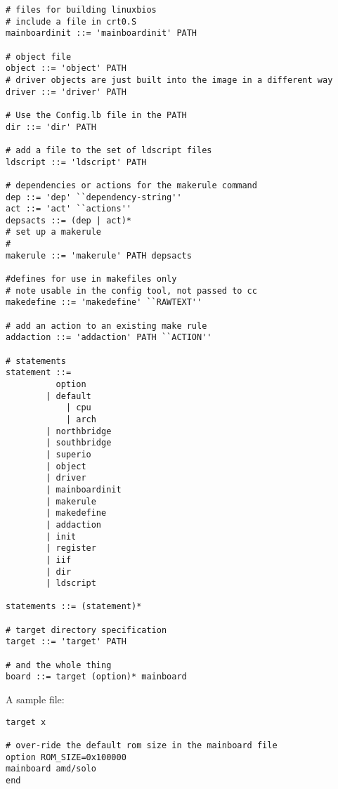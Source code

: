 \begin{verbatim}
# files for building linuxbios
# include a file in crt0.S 
mainboardinit ::= 'mainboardinit' PATH 

# object file 
object ::= 'object' PATH
# driver objects are just built into the image in a different way
driver ::= 'driver' PATH

# Use the Config.lb file in the PATH
dir ::= 'dir' PATH

# add a file to the set of ldscript files
ldscript ::= 'ldscript' PATH

# dependencies or actions for the makerule command
dep ::= 'dep' ``dependency-string''
act ::= 'act' ``actions''
depsacts ::= (dep | act)*
# set up a makerule
#
makerule ::= 'makerule' PATH depsacts

#defines for use in makefiles only
# note usable in the config tool, not passed to cc
makedefine ::= 'makedefine' ``RAWTEXT''

# add an action to an existing make rule
addaction ::= 'addaction' PATH ``ACTION''

# statements
statement ::= 
		  option
		| default
        	| cpu
        	| arch
		| northbridge
		| southbridge
		| superio
		| object
		| driver
		| mainboardinit
		| makerule
		| makedefine
		| addaction
		| init
		| register
		| iif
		| dir
		| ldscript

statements ::= (statement)*

# target directory specification
target ::= 'target' PATH

# and the whole thing
board ::= target (option)* mainboard

\end{verbatim}

A sample file:

\begin{verbatim}
target x

# over-ride the default rom size in the mainboard file
option ROM_SIZE=0x100000
mainboard amd/solo
end

\end{verbatim}

